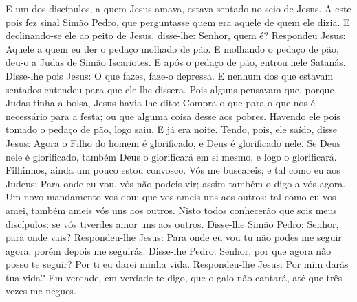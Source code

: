 {  E um dos discípulos, a quem Jesus amava, estava sentado
{} no seio de Jesus.
  A este pois fez sinal Simão Pedro, que perguntasse quem era aquele de quem ele dizia.
  E declinando-se ele ao peito de Jesus, disse-lhe: Senhor, quem é?
  Respondeu Jesus: Aquele a quem eu der o pedaço molhado de pão. E molhando o pedaço de pão, deu-o a Judas de Simão Iscariotes.
  E após o pedaço de pão, entrou nele Satanás. Disse-lhe pois Jesus: O que fazes, faze-o depressa.
  E nenhum dos que estavam sentados
{} entendeu para que ele lhe dissera.
  Pois alguns pensavam que, porque Judas tinha a bolsa, Jesus havia lhe dito: Compra o que para o que nos é necessário para a festa; ou que alguma coisa desse aos pobres.
  Havendo ele pois tomado o pedaço de pão, logo saiu. E já era noite.
  Tendo, pois, ele saído, disse Jesus: Agora o Filho do homem é glorificado, e Deus é glorificado nele.
  Se Deus nele é glorificado, também Deus o glorificará em si mesmo, e logo o glorificará.
  Filhinhos, ainda um pouco estou convosco. Vós me buscareis; e tal como eu aos Judeus: Para onde eu vou, vós não podeis vir; assim também o digo a vós agora.
  Um novo mandamento vos dou: que vos ameis uns aos outros; tal como eu vos amei, também ameis vós uns aos outros.
  Nisto todos conhecerão que sois meus discípulos: se vós tiverdes amor uns aos outros.
  Disse-lhe Simão Pedro: Senhor, para onde vais? Respondeu-lhe Jesus: Para onde eu vou tu não podes me seguir agora; porém depois me seguirás.
  Disse-lhe Pedro: Senhor, por que agora não posso te seguir? Por ti eu darei minha vida.
  Respondeu-lhe Jesus: Por mim darás tua vida? Em verdade, em verdade te digo, que o galo não cantará, até que três vezes me negues.
\par }

